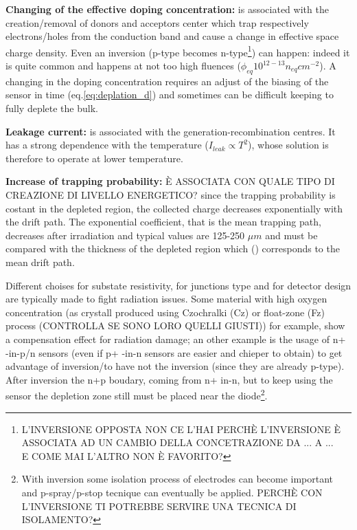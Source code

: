       \textbf{Changing of the effective doping concentration:} is associated with the creation/removal of donors and acceptors center which trap respectively electrons/holes from the conduction band and cause a change in effective space charge density. Even an inversion (p-type becomes n-type\footnote{L'INVERSIONE OPPOSTA NON CE L'HAI PERCHÈ L'INVERSIONE È ASSOCIATA AD UN CAMBIO DELLA CONCETRAZIONE DA ... A ...\\E COME MAI L'ALTRO NON È FAVORITO?}) can happen: indeed it is quite common and happens at not too high fluences ($\phi_{eq} 10^{12-13}n_{eq}cm^{-2}$). 
      A changing in the doping concentration requires an adjust of the biasing of the sensor in time (eq.\ref{eq:deplation_d}) and sometimes can be difficult keeping to fully deplete the bulk.

      \textbf{Leakage current:} is associated with the generation-recombination centres. It has a strong dependence with the temperature ($I_{leak}\propto T^2$), whose solution is therefore to operate at lower temperature.

      \textbf{Increase of trapping probability:}  È ASSOCIATA CON QUALE TIPO DI CREAZIONE DI LIVELLO ENERGETICO?
      since the trapping probability is costant in the depleted region, the collected charge decreases exponentially with the drift path. The exponential coefficient, that is the mean trapping path, decreases after irradiation and typical values are 125-250 $\mu m$ and must be compared with the thickness of the depleted region which () corresponds to the mean drift path.

      Different choises for substate resistivity, for junctions type and for detector design are typically made to fight radiation issues. Some material with high oxygen concentration (as crystall produced using Czochralki (Cz) or float-zone (Fz) process (CONTROLLA SE SONO LORO QUELLI GIUSTI)) for example, show a compensation effect for radiation damage; an other example is the usage of n+ -in-p/n sensors (even if p+ -in-n sensors are easier and chieper to obtain) to get advantage of inversion/to have not the inversion (since they are already p-type). After inversion the n+p boudary, coming from n+ in-n, but to keep using the sensor the depletion zone still must be placed near the diode\footnote{With inversion some isolation process of electrodes can become important and p-spray/p-stop tecnique can eventually be applied. PERCHÈ CON L'INVERSIONE TI POTREBBE SERVIRE UNA TECNICA DI ISOLAMENTO?}.

